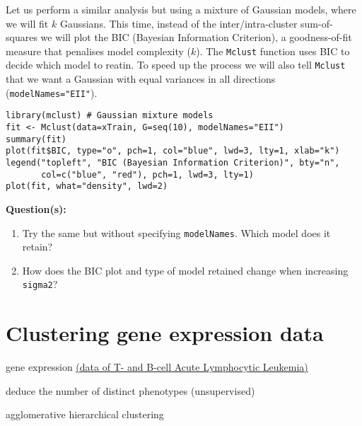 \documentclass[a4paper,11pt]{article}
\begin{document}
Let us perform a similar analysis but using a mixture of Gaussian models, where
we will fit $k$ Gaussians. This time, instead of the inter/intra-cluster sum-of-squares
we will plot the BIC (Bayesian Information Criterion), a goodness-of-fit measure that
penalises model complexity ($k$). The \texttt{Mclust} function uses BIC to decide which
model to reatin. To speed up the process we will also tell \texttt{Mclust} that we
want a Gaussian with equal variances in all directions (\texttt{modelNames="EII"}). 
\\
\begin{lstlisting}[style=RCode]
library(mclust) # Gaussian mixture models
fit <- Mclust(data=xTrain, G=seq(10), modelNames="EII")
summary(fit)
plot(fit$BIC, type="o", pch=1, col="blue", lwd=3, lty=1, xlab="k")
legend("topleft", "BIC (Bayesian Information Criterion)", bty="n",
       col=c("blue", "red"), pch=1, lwd=3, lty=1)
plot(fit, what="density", lwd=2)
\end{lstlisting}

\begin{framed}
\textbf{Question(s):}
\begin{enumerate}
	\item Try the same but without specifying \texttt{modelNames}. Which model does it retain?
	\item How does the BIC plot and type of model retained change when increasing \texttt{sigma2}?
\end{enumerate}
\end{framed}

\clearpage
\section{Clustering gene expression data}
\begin{framed}
\begin{description}[leftmargin=5em,style=nextline]\addtolength{\itemsep}{-0.2\baselineskip}
	\item[Data:] gene expression \href{http://www.bioconductor.org/packages/release/data/experiment/html/ALL.html}{(data of T- and B-cell Acute Lymphocytic Leukemia)}	
	\item[Task:] deduce the number of distinct phenotypes (unsupervised)
	\item[Method:] agglomerative hierarchical clustering
\end{description} 
\end{framed}
\end{document}
